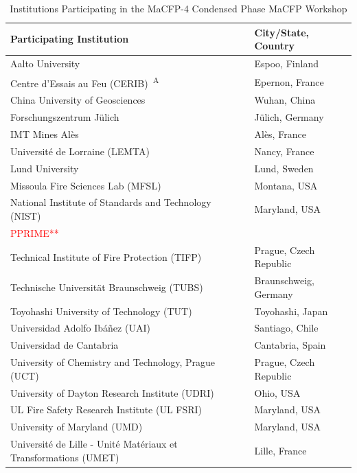 \documentclass{book}
\begin{document}
\begin{table}
\caption{Institutions Participating in the MaCFP-4 Condensed Phase MaCFP Workshop}
\label{Table:Institutions}
\begin{center}
\begin{tabular}{|ll|}
\hline
 \textbf{Participating Institution}     &  \textbf{City/State, Country} \\ \hline \hline
Aalto University                      	& Espoo, Finland \\ \hline
Centre d’Essais au Feu (CERIB)~\textsuperscript{A} 			& Epernon, France\\ \hline
China University of Geosciences			& Wuhan, China\\ \hline
Forschungszentrum Jülich				& Jülich, Germany \\ \hline
IMT Mines Alès							& Alès, France \\ \hline
Université de Lorraine (LEMTA) 			& Nancy, France \\ \hline
Lund University						    & Lund, Sweden \\ \hline
Missoula Fire Sciences Lab (MFSL)		& Montana, USA \\ \hline
National Institute of Standards and Technology (NIST)               & Maryland, USA \\ \hline
\textcolor{red}{PPRIME**}			&\\ \hline
Technical Institute of Fire Protection (TIFP)& Prague, Czech Republic \\ \hline
Technische Universität Braunschweig (TUBS)		& Braunschweig, Germany\\ \hline
Toyohashi University of Technology (TUT)			& Toyohashi, Japan\\ \hline
Universidad Adolfo Ibáñez (UAI)			& Santiago, Chile \\ \hline
Universidad de Cantabria				& Cantabria, Spain \\ \hline
 University of Chemistry and Technology, Prague (UCT) & Prague, Czech Republic \\ \hline
University of Dayton Research Institute (UDRI)	& Ohio, USA \\ \hline
UL Fire Safety Research Institute (UL FSRI)	& Maryland, USA \\ \hline
University of Maryland (UMD)            & Maryland, USA \\ \hline
Université de Lille - Unité Matériaux et Transformations (UMET)     & Lille, France \\ \hline

\end{tabular}
\end{center}
\end{table}
\end{document}
